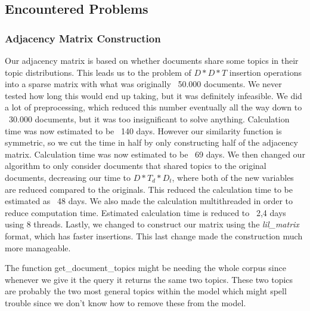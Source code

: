 \subsection{Encountered Problems}

\subsubsection{Adjacency Matrix Construction}
Our adjacency matrix is based on whether documents share some topics in their topic distributions. 
This leads us to the problem of $D*D*T$ insertion operations into a sparse matrix with what was originally ~50.000 documents. We never tested how long this would end up taking, but it was definitely infeasible.
We did a lot of preprocessing, which reduced this number eventually all the way down to ~30.000 documents, but it was too insignificant to solve anything. Calculation time was now estimated to be ~140 days.
However our similarity function is symmetric, so we cut the time in half by only constructing half of the adjacency matrix. Calculation time was now estimated to be ~69 days.
We then changed our algorithm to only consider documents that shared topics to the original documents, decreasing our time to $D*T_d*D_t$, where both of the new variables are reduced compared to the originals. This reduced the calculation time to be estimated as ~48 days.
We also made the calculation multithreaded in order to reduce computation time. Estimated calculation time is reduced to ~2,4 days using 8 threads.
Lastly, we changed to construct our matrix using the \emph{lil\_matrix} format, which has faster insertions. This last change made the construction much more manageable.


The function get\_document\_topics might be needing the whole corpus since whenever we give it the query it returns the same two topics. 
These two topics are probably the two most general topics within the model which might spell trouble since we don't know how to remove these from the model.

